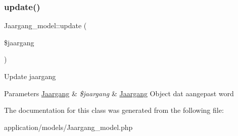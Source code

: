 \subsubsection{\texorpdfstring{update()}{update()}}
{\footnotesize\ttfamily Jaargang\+\_\+model\+::update (\begin{DoxyParamCaption}\item[{}]{\$jaargang }\end{DoxyParamCaption})}

Update jaargang 
\begin{DoxyParams}[1]{Parameters}
\mbox{\hyperlink{class_jaargang}{Jaargang}} & {\em \$jaargang} & \mbox{\hyperlink{class_jaargang}{Jaargang}} Object dat aangepast word \\
\hline
\end{DoxyParams}


The documentation for this class was generated from the following file\+:\begin{DoxyCompactItemize}
\item 
application/models/Jaargang\+\_\+model.\+php\end{DoxyCompactItemize}
